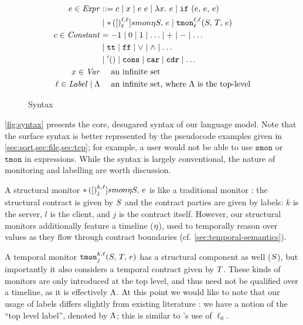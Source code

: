 \begin{figure}
\begin{align*}
e \in \mathit{Expr} &::=
      c
 \mid x
 \mid e\ e
 \mid \lambda x.\ e
 \mid {\tt if}{\ }({e,\,e,\,e}) \\
&\mid {\tt *}{\,}({[})^{\ell,\ell}_{\ell}]{smon}{\eta}{S,\, e}
 \mid {\tt tmon}{^{\ell,\ell}_{\ell}}({S,\,T,\,e}) \\
c \in \mathit{Constant} &=
 -1 \mid 0 \mid 1 \mid \ldots \mid + \mid - \mid \ldots \\
&\mid {\tt tt} \mid {\tt ff} \mid \vee \mid \wedge \mid \ldots \\
&\mid {\tt '()} \mid \tt cons \mid {\tt car} \mid {\tt cdr} \mid \ldots \\
x \in \mathit{Var} &\quad\text{ an infinite set} \\
\ell \in \mathit{Label} \mid \Lambda &\quad\text{ an infinite set, where $\Lambda$ is the top-level}
\end{align*}
\caption{Syntax}
\label{fig:syntax}
\end{figure}

%
\autoref{fig:syntax} presents the core, desugared syntax of our language model.
%
Note that the surface syntax is better represented by the pseudocode examples given in \cref{sec:sort,sec:file,sec:tcp}; for example, a user would not be able to use $\mathtt{smon}$ or $\mathtt{tmon}$ in expressions.
%
While the syntax is largely conventional, the nature of monitoring and labelling are worth discussion.

%
A structural monitor ${\tt *}{\,}({[})^{k,\ell}_{j}]{smon}{\eta}{S,\, e}$ is like a traditional monitor \cite{ianjohnson:dthf:complete}: the structural contract is given by $S$ and the contract parties are given by labels: $k$ is the server, $l$ is the client, and $j$ is the contract itself.
%
However, our structural monitors additionally feature a timeline ($\eta$), used to temporally reason over values as they flow through contract boundaries (cf. \autoref{sec:temporal-semantics}).
%

%
A temporal monitor ${\tt tmon}{^{k,\ell}_{j}}({S,\,T,\,e})$ has a structural component as well ($S$), but importantly it also considers a temporal contract given by $T$.
%
These kinds of monitors are only introduced at the top level, and thus need not be qualified over a timeline, as it is effectively $\Lambda$.
%
At this point we would like to note that our usage of labels differs slightly from existing literature \cite{ianjohnson:dthf:complete}: we have a notion of the ``top level label'', denoted by $\Lambda$; this is similar to \citeauthor{ianjohnson:dthf:complete}'s use of $\ell_0$.

